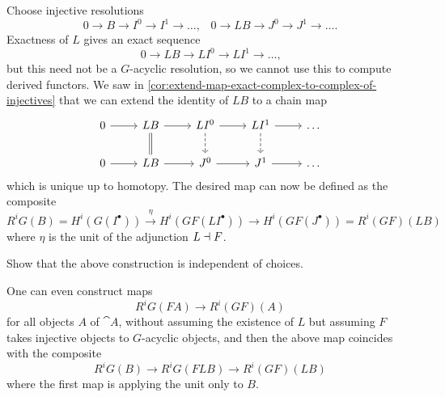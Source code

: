 Choose injective resolutions
\[ 0\to B\to I^0\to I^1\to\ldots\text{,} \quad 0\to LB\to J^0\to J^1\to\ldots\text{.} \]
Exactness of \(L\) gives an exact sequence
\[ 0\to LB\to LI^0\to LI^1\to\ldots\text{,} \]
but this need not be a \(G\)-acyclic resolution, so we cannot use this to compute derived functors.
We saw in \cref{cor:extend-map-exact-complex-to-complex-of-injectives} that we can extend the identity of \(LB\) to a chain map
\begin{equation*}
  \begin{tikzcd}
    0 \ar[r] & LB \ar[r] \ar[d, equal] & LI^0 \ar[r] \ar[d, dashed] & LI^1 \ar[r] \ar[d, dashed] & \ldots \\
    0 \ar[r] & LB \ar[r] & J^0 \ar[r] & J^1 \ar[r] & \ldots
  \end{tikzcd}
\end{equation*}
which is unique up to homotopy.
The desired map can now be defined as the composite
\[ R^iG(B) = H^i(G(I^\bullet)) \xrightarrow{\eta} H^i(GF(LI^\bullet)) \to H^i(GF(J^\bullet)) = R^i(GF)(LB) \]
where \(\eta\) is the unit of the adjunction \(L\dashv F\).

\begin{exc}
Show that the above construction is independent of choices.
\end{exc}

\begin{rmk}
One can even construct maps
\[ R^iG(FA) \to R^i(GF)(A) \]
for all objects \(A\) of \(\cat A\), without assuming the existence of \(L\) but assuming \(F\) takes injective objects to \(G\)-acyclic objects, and then the above map coincides with the composite
\[ R^iG(B) \to R^iG(FLB) \to R^i(GF)(LB) \]
where the first map is applying the unit only to \(B\).
\end{rmk}

